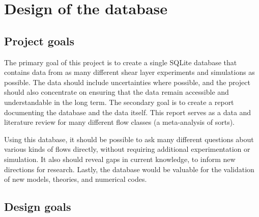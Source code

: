 %
\chapter{Design of the database}


\section{Project goals}

The primary goal of this project is to create a single SQLite database that
contains data from as many different shear layer experiments and simulations as
possible.  The data should include uncertainties where possible, and the
project should also concentrate on ensuring that the data remain accessible and
understandable in the long term.  The secondary goal is to create a report
documenting the database and the data itself.  This report serves as a data and
literature review for many different flow classes (a meta-analysis of sorts).

Using this database, it should be possible to ask many different questions
about various kinds of flows directly, without requiring additional
experimentation or simulation.  It also should reveal gaps in current
knowledge, to inform new directions for research.  Lastly, the database would
be valuable for the validation of new models, theories, and numerical codes.


\section{Design goals}


